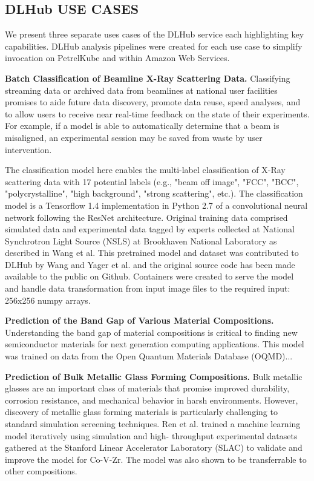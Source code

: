\documentclass{aip-cp}
\newcommand\ben[1]{}
\newcommand\ben[1]{{\color{blue}[Ben: #1]}}
\begin{document}
\subsection{DLHub USE CASES}
We present three separate uses cases of the DLHub service each highlighting
key capabilities. DLHub analysis pipelines were created for each
use case to simplify invocation on PetrelKube and within Amazon Web Services.
\ben{refine and add based on other paper components and DLHub architecture section}

\textbf{Batch Classification of Beamline X-Ray Scattering Data.}
Classifying streaming data or archived data from beamlines at national user
facilities promises to aide future data discovery, promote data reuse, speed
analyses, and to allow users to receive near real-time feedback on the state
of their experiments. For example, if a model is able to automatically
determine that a beam is misaligned, an experimental session may be saved from
waste by user intervention.

The classification model here enables the multi-label classification of X-Ray
scattering data with 17 potential labels (e.g., "beam off image", "FCC",
"BCC", "polycrystalline", "high background", "strong scattering", etc.). The
classification model is a Tensorflow 1.4 implementation in Python 2.7 of a
convolutional neural network following the ResNet architecture. Original
training data comprised simulated data and experimental data tagged by experts
collected at National Synchrotron Light Source (NSLS) at Brookhaven National
Laboratory as described in Wang et al. This pretrained model and dataset was
contributed to DLHub by Wang and Yager et al. and the original source code has
been made available to the public on Github. Containers were created to serve
the model and handle data transformation from input image files to the
required input: 256x256 numpy arrays.

\ben{Add DLHub usage details here}


\textbf{Prediction of the Band Gap of Various Material Compositions.}
Understanding the band gap of material compositions is critical
to finding new semiconductor materials for next generation computing
applications. This model was trained on data from the Open Quantum Materials
Database (OQMD)...
\ben{More model details}
\ben{Add DLHub usage details here}

\textbf{Prediction of Bulk Metallic Glass Forming Compositions.}
Bulk metallic glasses are an important class of materials that promise
improved durability, corrosion resistance, and mechanical behavior in harsh
environments. However, discovery of metallic glass forming materials is
particularly challenging to standard simulation screening techniques. Ren et
al. trained a machine learning model iteratively using simulation and high-
throughput experimental datasets gathered at the Stanford Linear Accelerator
Laboratory (SLAC) to validate and improve the model for Co-V-Zr. The model was
also shown to be transferrable to other compositions.
\end{document}
